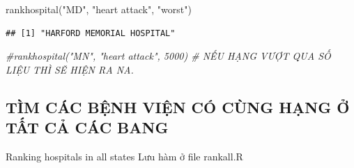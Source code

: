 \documentclass[
]{book}
\newenvironment{Shaded}{\begin{snugshade}}{\end{snugshade}}
\newcommand{\CommentTok}[1]{\textcolor[rgb]{0.56,0.35,0.01}{\textit{#1}}}
\newcommand{\FunctionTok}[1]{\textcolor[rgb]{0.00,0.00,0.00}{#1}}
\newcommand{\NormalTok}[1]{#1}
\newcommand{\StringTok}[1]{\textcolor[rgb]{0.31,0.60,0.02}{#1}}
\theoremstyle{definition}
\theoremstyle{definition}
\theoremstyle{definition}
\theoremstyle{definition}
\theoremstyle{remark}
\begin{document}
\begin{Shaded}
\begin{Highlighting}[]
\FunctionTok{rankhospital}\NormalTok{(}\StringTok{"MD"}\NormalTok{, }\StringTok{"heart attack"}\NormalTok{, }\StringTok{"worst"}\NormalTok{)}
\end{Highlighting}
\end{Shaded}

\begin{verbatim}
## [1] "HARFORD MEMORIAL HOSPITAL"
\end{verbatim}

\begin{Shaded}
\begin{Highlighting}[]
\CommentTok{\#rankhospital("MN", "heart attack", 5000) \# NẾU HẠNG VƯỢT QUA SỐ LIỆU THÌ SẼ HIỆN RA \textquotesingle{}NA\textquotesingle{}.}
\end{Highlighting}
\end{Shaded}

\hypertarget{tuxecm-cuxe1c-bux1ec7nh-viux1ec7n-cuxf3-cuxf9ng-hux1ea1ng-ux1edf-tux1ea5t-cux1ea3-cuxe1c-bang}{%
\subsection{TÌM CÁC BỆNH VIỆN CÓ CÙNG HẠNG Ở TẤT CẢ CÁC BANG}\label{tuxecm-cuxe1c-bux1ec7nh-viux1ec7n-cuxf3-cuxf9ng-hux1ea1ng-ux1edf-tux1ea5t-cux1ea3-cuxe1c-bang}}

Ranking hospitals in all states
Lưu hàm ở file rankall.R
\end{document}

